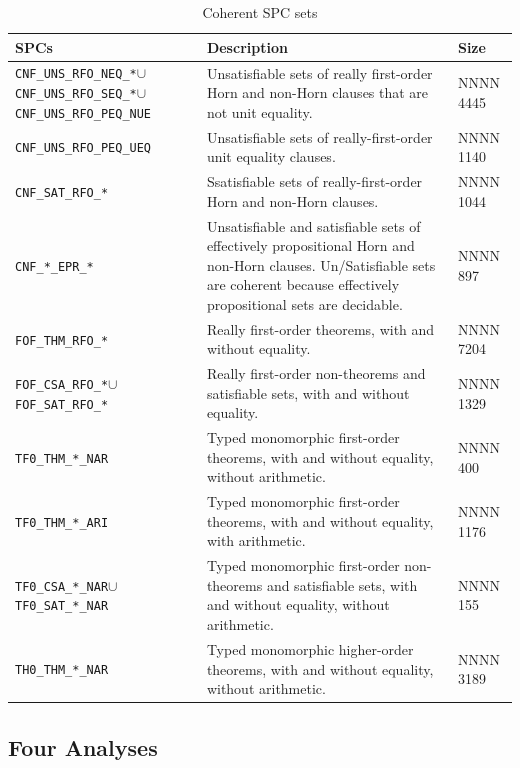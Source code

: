 \documentclass[runningheads]{llncs}
\begin{document}
\begin{table}[h!]
\center
\begin{tabular}{p{3.5cm}|p{7cm}|R{1cm}}
\hline
SPCs & Description & Size \\
\hline
{\tt CNF\_UNS\_RFO\_NEQ\_*}\enspace$\cup$ {\tt CNF\_UNS\_RFO\_SEQ\_*}\enspace$\cup$
{\tt CNF\_UNS\_RFO\_PEQ\_NUE} &
Unsatisfiable sets of really first-order Horn and non-Horn clauses that are not unit equality.
& NNNN 4445 \\  %
{\tt CNF\_UNS\_RFO\_PEQ\_UEQ} &
Unsatisfiable sets of really-first-order unit equality clauses.
& NNNN 1140 \\
{\tt CNF\_SAT\_RFO\_*} &
Ssatisfiable sets of really-first-order Horn and non-Horn clauses.
& NNNN 1044 \\
{\tt CNF\_*\_EPR\_*} &
Unsatisfiable and satisfiable sets of effectively propositional Horn and non-Horn clauses.
Un/Satisfiable sets are coherent because effectively propositional sets are decidable.
& NNNN 897 \\
{\tt FOF\_THM\_RFO\_*} &
Really first-order theorems, with and without equality.
& NNNN 7204 \\
{\tt FOF\_CSA\_RFO\_*}\enspace$\cup$ {\tt FOF\_SAT\_RFO\_*} &
Really first-order non-theorems and satisfiable sets, with and without equality.
& NNNN 1329 \\ %
{\tt TF0\_THM\_*\_NAR} &
Typed monomorphic first-order theorems, with and without equality, without arithmetic.
& NNNN 400 \\
{\tt TF0\_THM\_*\_ARI} &
Typed monomorphic first-order theorems, with and without equality, with arithmetic.
& NNNN 1176 \\
{\tt TF0\_CSA\_*\_NAR}\enspace$\cup$ {\tt TF0\_SAT\_*\_NAR} &
Typed monomorphic first-order non-theorems and satisfiable sets, with and without equality, without 
arithmetic.
& NNNN 155 \\ %
{\tt TH0\_THM\_*\_NAR} &
Typed monomorphic higher-order theorems, with and without equality, without arithmetic.
& NNNN 3189 \\
\hline
\end{tabular}
\vspace*{0.5em}
\caption{Coherent SPC sets}
\label{SPCSets}
\end{table}

\subsection{Four Analyses}
\label{AnalysisTypes}
\end{document}
